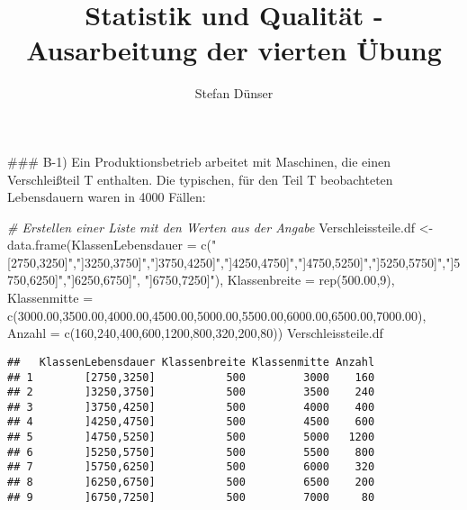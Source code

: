 \documentclass[
]{article}
\title{Statistik und Qualität - Ausarbeitung der vierten Übung}
\author{Stefan Dünser}
\date{}
\newenvironment{Shaded}{\begin{snugshade}}{\end{snugshade}}
\newcommand{\AttributeTok}[1]{\textcolor[rgb]{0.77,0.63,0.00}{#1}}
\newcommand{\CommentTok}[1]{\textcolor[rgb]{0.56,0.35,0.01}{\textit{#1}}}
\newcommand{\DecValTok}[1]{\textcolor[rgb]{0.00,0.00,0.81}{#1}}
\newcommand{\FloatTok}[1]{\textcolor[rgb]{0.00,0.00,0.81}{#1}}
\newcommand{\FunctionTok}[1]{\textcolor[rgb]{0.00,0.00,0.00}{#1}}
\newcommand{\NormalTok}[1]{#1}
\newcommand{\OtherTok}[1]{\textcolor[rgb]{0.56,0.35,0.01}{#1}}
\newcommand{\StringTok}[1]{\textcolor[rgb]{0.31,0.60,0.02}{#1}}
\begin{document}
\maketitle

\#\#\# B-1) Ein Produktionsbetrieb arbeitet mit Maschinen, die einen
Verschleißteil T enthalten. Die typischen, für den Teil T beobachteten
Lebensdauern waren in 4000 Fällen:

\begin{Shaded}
\begin{Highlighting}[]
\CommentTok{\# Erstellen einer Liste mit den Werten aus der Angabe}
\NormalTok{Verschleissteile.df }\OtherTok{\textless{}{-}} \FunctionTok{data.frame}\NormalTok{(}\AttributeTok{KlassenLebensdauer =} \FunctionTok{c}\NormalTok{(}\StringTok{"[2750,3250]"}\NormalTok{,}\StringTok{"]3250,3750]"}\NormalTok{,}\StringTok{"]3750,4250]"}\NormalTok{,}\StringTok{"]4250,4750]"}\NormalTok{,}\StringTok{"]4750,5250]"}\NormalTok{,}\StringTok{"]5250,5750]"}\NormalTok{,}\StringTok{"]5750,6250]"}\NormalTok{,}\StringTok{"]6250,6750]"}\NormalTok{, }\StringTok{"]6750,7250]"}\NormalTok{), }\AttributeTok{Klassenbreite =} \FunctionTok{rep}\NormalTok{(}\FloatTok{500.00}\NormalTok{,}\DecValTok{9}\NormalTok{), }\AttributeTok{Klassenmitte =} \FunctionTok{c}\NormalTok{(}\FloatTok{3000.00}\NormalTok{,}\FloatTok{3500.00}\NormalTok{,}\FloatTok{4000.00}\NormalTok{,}\FloatTok{4500.00}\NormalTok{,}\FloatTok{5000.00}\NormalTok{,}\FloatTok{5500.00}\NormalTok{,}\FloatTok{6000.00}\NormalTok{,}\FloatTok{6500.00}\NormalTok{,}\FloatTok{7000.00}\NormalTok{), }\AttributeTok{Anzahl =} \FunctionTok{c}\NormalTok{(}\DecValTok{160}\NormalTok{,}\DecValTok{240}\NormalTok{,}\DecValTok{400}\NormalTok{,}\DecValTok{600}\NormalTok{,}\DecValTok{1200}\NormalTok{,}\DecValTok{800}\NormalTok{,}\DecValTok{320}\NormalTok{,}\DecValTok{200}\NormalTok{,}\DecValTok{80}\NormalTok{))}
\NormalTok{  Verschleissteile.df}
\end{Highlighting}
\end{Shaded}

\begin{verbatim}
##   KlassenLebensdauer Klassenbreite Klassenmitte Anzahl
## 1        [2750,3250]           500         3000    160
## 2        ]3250,3750]           500         3500    240
## 3        ]3750,4250]           500         4000    400
## 4        ]4250,4750]           500         4500    600
## 5        ]4750,5250]           500         5000   1200
## 6        ]5250,5750]           500         5500    800
## 7        ]5750,6250]           500         6000    320
## 8        ]6250,6750]           500         6500    200
## 9        ]6750,7250]           500         7000     80
\end{verbatim}
\end{document}

